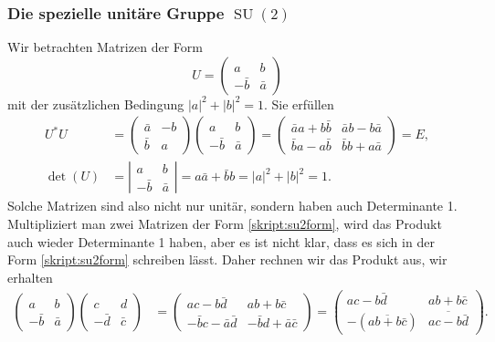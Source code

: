 \subsubsection{Die spezielle unitäre Gruppe $\operatorname{SU}(2)$}
Wir betrachten Matrizen der Form
\begin{equation}
U=
\begin{pmatrix}
a&b\\-\bar b&\bar a
\end{pmatrix}
\label{skript:su2form}
\end{equation}
mit der zusätzlichen Bedingung $|a|^2 + |b|^2=1$. Sie erfüllen
\begin{align*}
U^*U
&=
\begin{pmatrix}
\bar a&-b\\\bar b&a
\end{pmatrix}
\begin{pmatrix}
a&b\\-\bar b&\bar a
\end{pmatrix}
=
\begin{pmatrix}
\bar aa+b\bar b & \bar ab-b\bar a\\
\bar ba-a\bar b & \bar bb+a\bar a
\end{pmatrix}
=
E,
\\
\det(U)&=\left|
\begin{matrix}
a&b\\-\bar b&\bar a
\end{matrix}
\right|
=
a\bar a+\bar bb = |a|^2 + |b|^2=1.
\end{align*}
Solche Matrizen sind also nicht nur unitär, sondern haben auch Determinante 1.
Multipliziert man zwei Matrizen der Form \eqref{skript:su2form},
wird das Produkt auch wieder Determinante 1 haben, aber es ist nicht klar,
dass es sich in der Form \eqref{skript:su2form} schreiben lässt.
Daher rechnen wir das Produkt aus, wir erhalten
\begin{align*}
\begin{pmatrix}  a                        & b                      \\
                 -\bar b                  & \bar a                 \end{pmatrix}
\begin{pmatrix}  c                        & d                      \\
                 -\bar d                  & \bar c                 \end{pmatrix}
&=
\begin{pmatrix}  ac-b\bar d               & ab+b\bar c             \\
                 -\bar bc-\bar a\bar d    & -\bar bd +\bar a\bar c \end{pmatrix}
=
\begin{pmatrix}  ac-b\bar d               & ab+b\bar c             \\
                 -(\overline{ab+b\bar c}) & \overline{ac-b\bar d}  \end{pmatrix}
.
\end{align*}
